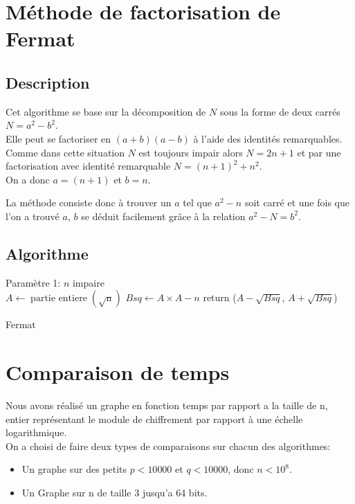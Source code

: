 \documentclass[a4paper, 12pt]{article}
\begin{document}
\newpage
\section{Méthode de factorisation de Fermat}

\subsection{Description}

Cet algorithme se base sur la décomposition de $N$ sous la forme de deux carrés $N = a^2 - b^2$. \\
Elle peut se factoriser en $(a + b)(a - b)$ à l'aide des identités remarquables.\\
Comme dans cette situation $N$ est toujours impair alors $N = 2n + 1$ et par une factorisation avec identité remarquable
$N = (n + 1)^2 + n^2$. \\ 
On a donc $a = (n + 1)$ et $b = n$.

La méthode consiste donc à trouver un $a$ tel que $a^2 - n$ soit carré et une fois que l'on a trouvé $a$, 
$b$ se déduit facilement grâce à la relation $a^2 - N = b^2$.
\subsection{Algorithme}

\begin{algorithm}[H]
\SetAlgoLined
Paramètre 1: $n$ impaire \\
    $A \xleftarrow{} \operatorname{partie\ entiere} ( \operatorname{\sqrt{n}} )$ \;
    $Bsq \xleftarrow{} A \times A - n$ \;
    return ($A - \sqrt{Bsq}$, $A + \sqrt{Bsq}$)
\caption{Fermat}
\end{algorithm}


\newpage
\section{Comparaison de temps}

Nous avons réalisé un graphe en fonction temps par rapport a la taille de n, entier représentant le module de chiffrement par rapport à une échelle logarithmique. \\
On a choisi de faire deux types de comparaisons sur chacun des algorithmes:
\begin{itemize}[label=\textbullet]
    \item Un graphe sur des petits $p < 10 000$ et $q < 10 000$, donc $n < 10^8$.
    \item Un Graphe sur n de taille 3 jusqu'a 64 bits.
\end{itemize}
\end{document}
